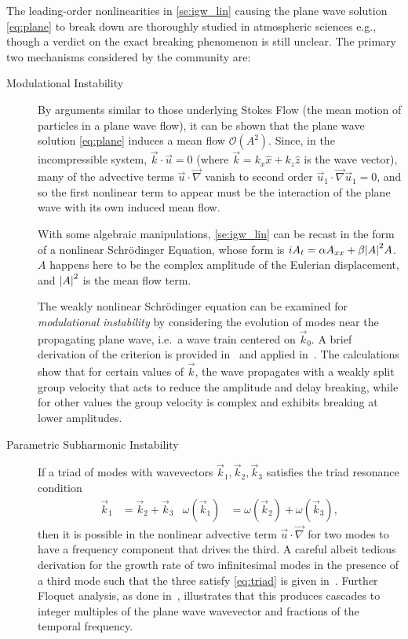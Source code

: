 \documentclass[11pt,
        usenames, %
        dvipsnames %
    ]{article}
\DeclarePairedDelimiter\abs{\lvert}{\rvert}
\begin{document}
The leading-order nonlinearities in \autoref{se:igw_lin} causing the plane wave
solution \autoref{eq:plane} to break down are thoroughly studied in atmospheric
sciences e.g.\cite{Sutherland1}\cite{Sutherland2}, though a verdict on the exact
breaking phenomenon is still unclear. The primary two mechanisms considered by
the community are:
\begin{description}
    \item[Modulational Instability] By arguments similar to those underlying
        Stokes Flow (the mean motion of particles in a plane wave flow), it can
        be shown that the plane wave solution \autoref{eq:plane} induces a mean
        flow $\mathcal{O}(A^2)$. Since, in the incompressible system, $\vec{k}
        \cdot \vec{u} = 0$ (where $\vec{k} = k_x\hat{x} + k_z\hat{z}$ is the
        wave vector), many of the advective terms $\vec{u} \cdot \vec{\nabla}$
        vanish to second order $\vec{u}_1 \cdot \vec{\nabla}\vec{u}_1 = 0$, and
        so the first nonlinear term to appear must be the interaction of the
        plane wave with its own induced mean flow.

        With some algebraic manipulations, \autoref{se:igw_lin} can be recast in
        the form of a nonlinear Schr\"odinger Equation, whose form is $iA_t =
        \alpha A_{xx} + \beta \abs*{A}^2A$. $A$ happens here to be the complex
        amplitude of the Eulerian displacement, and $\abs*{A}^2$ is the mean
        flow term.

        The weakly nonlinear Schr\"odinger equation can be examined for
        \emph{modulational instability} by considering the evolution of modes
        near the propagating plane wave, i.e.\ a wave train centered on
        $\vec{k}_0$. A brief derivation of the criterion is provided
        in~\cite{Whitham} and applied in~\cite{Sutherland1}. The calculations
        show that for certain values of $\vec{k}$, the wave propagates with a
        weakly split group velocity that acts to reduce the amplitude and delay
        breaking, while for other values the group velocity is complex and
        exhibits breaking at lower amplitudes.

    \item[Parametric Subharmonic Instability] If a triad of modes with
        wavevectors $\vec{k}_1, \vec{k}_2, \vec{k}_3$ satisfies the triad
        resonance condition
        \begin{align}
            \vec{k}_1 &= \vec{k}_2 + \vec{k}_3 &
            \omega(\vec{k}_1) &= \omega(\vec{k}_2) + \omega(\vec{k}_3),
            \label{eq:triad}
        \end{align}
        then it is possible in the nonlinear advective term $\vec{u} \cdot
        \vec{\nabla}$ for two modes to have a frequency component that drives
        the third. A careful albeit tedious derivation for the growth rate of
        two infinitesimal modes in the presence of a third mode such that the
        three satisfy \autoref{eq:triad} is given in~\cite{psi}. Further Floquet
        analysis, as done in~\cite{DrazinFloquet}, illustrates that this
        produces cascades to integer multiples of the plane wave wavevector and
        fractions of the temporal frequency.


\end{description}
\end{document}
